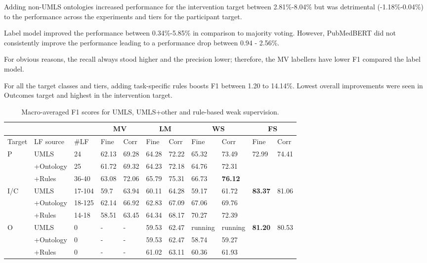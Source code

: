 \documentclass[10.7pt,]{article}
\begin{document}
Adding non-UMLS ontologies increased performance for the intervention target between 2.81\%-8.04\% but was detrimental (-1.18\%-0.04\%) to the performance across the experiments and tiers for the participant target.

Label model improved the performance between 0.34\%-5.85\% in comparison to majority voting.
However, PubMedBERT did not consistently improve the performance leading to a performance drop between 0.94 - 2.56\%.

For obvious reasons, the recall always stood higher and the precision lower; therefore, the MV labellers have lower F1 compared the label model.


For all the target classes and tiers, adding task-specific rules boosts F1 between 1.20 to 14.14\%.
Lowest overall improvements were seen in Outcomes target and highest in the intervention target.
%
\begin{table}[!ht]
    \centering
    \begin{tabular}{|l|l|l|l|l|l|l|l|l|l|l|}
        \hline
        \multicolumn{3}{|c|}{} &
        \multicolumn{2}{|c|}{MV} & \multicolumn{2}{|c|}{LM} & \multicolumn{2}{|c|}{WS} & \multicolumn{2}{|c|}{FS} \\
        \hline
        Target & LF source & \#LF & Fine & Corr & Fine & Corr & Fine & Corr & Fine & Corr \\
        \hline
        P & UMLS & 24 & 62.13 & 69.28 & 64.28 & 72.22 & 65.32 & 73.49 & 72.99 & 74.41 \\ 
        ~ & +Ontology & 25 & 61.72 & 69.32 & 64.23 & 72.18 & 64.76 & 72.31 & ~ & ~ \\ 
        ~ & +Rules & 36-40 & 63.08 & 72.06 & 65.79 & 75.31 & 66.73 & \textbf{76.12} & ~ & ~ \\ \hline
        I/C & UMLS & 17-104 &59.7 & 63.94 & 60.11 & 64.28 & 59.17 & 61.72 & \textbf{83.37} & 81.06 \\ 
        ~ & +Ontology & 18-125 & 62.14 & 66.92 & 62.83 & 67.09 & 67.06 & 69.76 & ~ & ~ \\ 
        ~ & +Rules & 14-18 & 58.51 & 63.45 & 64.34 & 68.17 & 70.27 & 72.39 & ~ & ~ \\  \hline
        O & UMLS & 0 & - & - & 59.53 & 62.47 & running & running & \textbf{81.20} & 80.53 \\ 
        ~ & +Ontology & 0 & - & - & 59.53 & 62.47 & 58.74 & 59.27 & ~ & ~ \\ 
        ~ & +Rules & 0 & - & - & 61.02 & 63.11 & 60.36 & 61.93 & ~ & ~ \\ \hline
    \end{tabular}
    \caption{\label{tab:res} Macro-averaged F1 scores for UMLS, UMLS+other and rule-based weak supervision.}
\end{table}
\end{document}
